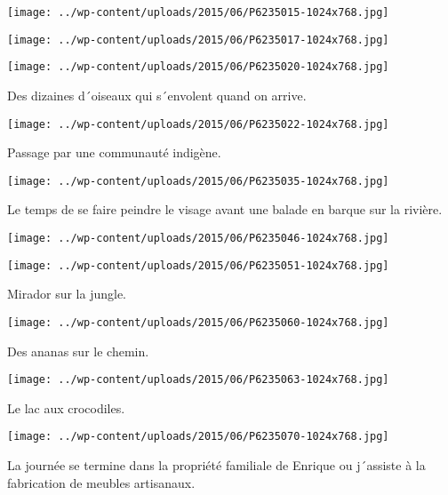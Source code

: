  \newline
\centerline{\texttt{[image: ../wp-content/uploads/2015/06/P6235015-1024x768.jpg]} } 
 \newline
 \newline
\centerline{\texttt{[image: ../wp-content/uploads/2015/06/P6235017-1024x768.jpg]} } 
 \newline
 \newline
\centerline{\texttt{[image: ../wp-content/uploads/2015/06/P6235020-1024x768.jpg]} } 
 \newline
 Des dizaines d´oiseaux qui s´envolent quand on arrive. \newline
 \newline
\centerline{\texttt{[image: ../wp-content/uploads/2015/06/P6235022-1024x768.jpg]} } 
 \newline
 Passage par une communauté indigène. \newline
 \newline
\centerline{\texttt{[image: ../wp-content/uploads/2015/06/P6235035-1024x768.jpg]} } 
 \newline
 Le temps de se faire peindre le visage avant une balade en barque sur la rivière. \newline
 \newline
\centerline{\texttt{[image: ../wp-content/uploads/2015/06/P6235046-1024x768.jpg]} } 
 \newline
 \newline
\centerline{\texttt{[image: ../wp-content/uploads/2015/06/P6235051-1024x768.jpg]} } 
 \newline
 Mirador sur la jungle. \newline
 \newline
\centerline{\texttt{[image: ../wp-content/uploads/2015/06/P6235060-1024x768.jpg]} } 
 \newline
 Des ananas sur le chemin. \newline
 \newline
\centerline{\texttt{[image: ../wp-content/uploads/2015/06/P6235063-1024x768.jpg]} } 
 \newline
 Le lac aux crocodiles. \newline
 \newline
\centerline{\texttt{[image: ../wp-content/uploads/2015/06/P6235070-1024x768.jpg]} } 
 \newline
 La journée se termine dans la propriété familiale de Enrique ou j´assiste à la fabrication de meubles artisanaux. \newline
